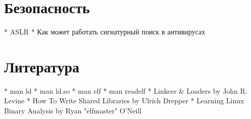 \documentclass[../../lectures.tex]{subfiles}
\begin{document}
\section{Безопасность}
  * ASLR
  * Как может работать сигнатурный поиск в антивирусах

\section{Литература}
  * man ld
  * man ld.so
  * man elf
  * man readelf
  * Linkers \& Loaders by John R. Levine
  * How To Write Shared Libraries by Ulrich Drepper
  * Learning Linux Binary Analysis by Ryan "elfmaster" O'Neill
\end{document}

